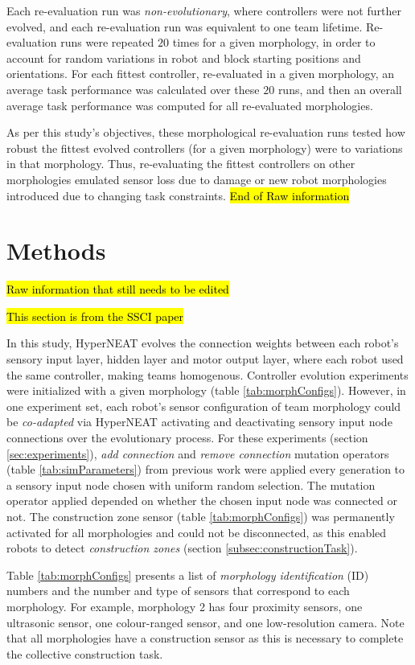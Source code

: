 \documentclass[conference]{IEEEtran}
\begin{document}
Each re-evaluation run was \textit{non-evolutionary}, where controllers were not further evolved,
and each re-evaluation run was equivalent to one team lifetime.
Re-evaluation runs were repeated $20$ times for a given morphology, in order to account for random variations in robot and block
starting positions and orientations.
For each fittest controller, re-evaluated in a given morphology, an average task performance was
calculated over these $20$ runs, and then an overall average task performance was computed for
all re-evaluated morphologies.

As per this study's objectives, these morphological re-evaluation
runs tested how robust the fittest evolved controllers (for a given morphology) were to variations
in that morphology.
Thus, re-evaluating the fittest controllers on other morphologies emulated sensor loss due
to damage or new robot morphologies introduced due to changing task constraints.
\hl{End of Raw information}

\section{Methods}
\hl{Raw information that still needs to be edited}

\hl{This section is from the SSCI paper}

In this study, HyperNEAT evolves the connection weights between each robot's sensory input layer,
hidden layer and motor output layer, where each robot used the same controller, making teams
homogenous.
Controller evolution experiments were initialized with a given morphology (table \ref{tab:morphConfigs}).
However, in one experiment set, each robot's sensor configuration of team morphology could be
\textit{co-adapted} via HyperNEAT activating and deactivating sensory input node connections over
the evolutionary process.
For these experiments (section \ref{sec:experiments}), \textit{add connection} and
\textit{remove connection} mutation operators (table \ref{tab:simParameters}) from previous work
\cite{HewlandNitschke2015} were applied every generation to a sensory input node
chosen with uniform random selection.  The mutation operator applied depended on whether the chosen input
node was connected or not.  The construction zone sensor (table \ref{tab:morphConfigs}) was permanently activated
for all morphologies and could not be disconnected, as this enabled robots to detect \textit{construction zones}
(section \ref{subsec:constructionTask}).

Table \ref{tab:morphConfigs} presents a list of \textit{morphology identification} (ID) numbers and the
number and type of sensors that correspond to each morphology.
For example, morphology 2 has four proximity sensors, one ultrasonic sensor, one colour-ranged sensor, and
one low-resolution camera.
Note that all morphologies have a construction sensor as this is necessary to complete the collective construction task.
\end{document}
